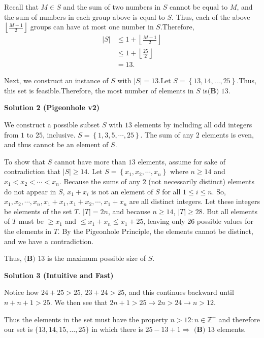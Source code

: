\begin{enumerate}
 Recall that $M \in S$ and the sum of two numbers in $S$ cannot be equal to $M$, and the sum of numbers in each group above is equal to $S$. Thus, each of the above $\left\lfloor \frac{M-1}{2} \right\rfloor$ groups can have at most one number in $S$.Therefore,
 \begin{align*} |S| & \leq 1 + \left\lfloor \frac{M-1}{2} \right\rfloor \\ & \leq 1 + \left\lfloor \frac{25}{2} \right\rfloor \\ & = 13. \end{align*}


 Next, we construct an instance of $S$ with $|S| = 13$.Let $S = \left\{ 13, 14, \ldots , 25 \right\}$.Thus, this set is feasible.Therefore, the most number of elements in $S$ is$\boxed{\textbf{(B) }13}$.

 



\textbf{Solution 2 (Pigeonhole v2)}

We construct a possible subset $S$ with $13$ elements by including all odd integers from $1$ to $25$, inclusive. $S=\left\{ 1, 3, 5, \cdots , 25 \right\}$. The sum of any $2$ elements is even, and thus cannot be an element of $S$.

 To show that $S$ cannot have more than $13$ elements, assume for sake of contradiction that $|S| \geq 14$. Let $S=\left\{ x_1, x_2, \cdots , x_n \right\}$ where $n \geq 14$ and $x_1 < x_2 < \cdots < x_n$. Because the sums of any $2$ (not necessarily distinct) elements do not appear in $S$, $x_1+x_i$ is not an element of $S$ for all $1 \leq i \leq n$. So, $x_1, x_2, \cdots , x_n , x_1+x_1, x_1+x_2, \cdots , x_1+x_n$ are all distinct integers. Let these integers be elements of the set $T$. $|T|=2n$, and because $n \geq 14$, $|T| \geq 28$. But all elements of $T$ must be $\geq x_1$ and $\leq x_1+x_n \leq x_1+25$, leaving only 26 possible values for the elements in $T$. By the Pigeonhole Principle, the elements cannot be distinct, and we have a contradiction.

 Thus, $\boxed{\textbf{(B) }13}$ is the maximum possible size of $S$.

 



\textbf{Solution 3 (Intuitive and Fast)}

Notice how \( 24 + 25 > 25 \), \( 23 + 24 > 25 \), and this continues backward until \( n + n+1 > 25 \). We then see that \( 2n+1 > 25 \rightarrow 2n > 24 \rightarrow n > 12 \).

 Thus the elements in the set must have the property \( n > 12 : n \in \mathbb{Z}^+ \) and therefore our set is \( \{13, 14, 15, \dots, 25\} \) in which there is \( 25 - 13 + 1 \Rightarrow \) $\boxed{\textbf{(B) }13}$ elements.


\end{enumerate}
